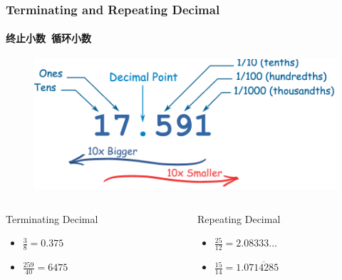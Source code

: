 \documentclass[
	11pt, %
]{beamer}
\begin{document}

\begin{frame}
\frametitle{Terminating and  Repeating Decimal}
\framesubtitle{终止小数\ 循环小数}

		\begin{figure}
		\includegraphics[width=0.5\linewidth]{Decimal.png}
	  \end{figure}

	  \begin{columns}[t] %
			\begin{column}{0.45\textwidth} %
						\begin{exampleblock}{Terminating Decimal}
								\begin{itemize}
									\item $\frac{3}{8} = 0.375$
									\item $\frac{259}{40} = 6475$
								\end{itemize}							
						\end{exampleblock}
			\end{column}

			\begin{column}{0.5\textwidth} %
			\begin{exampleblock}{Repeating Decimal}
								\begin{itemize}
									\item $\frac{25}{12} = 2.08333 \ldots$
									\item $\frac{15}{14} = 1.0\overline{714285}$
								\end{itemize}	
			\end{exampleblock}
			\end{column}
	\end{columns}
\end{frame}

\end{document}
